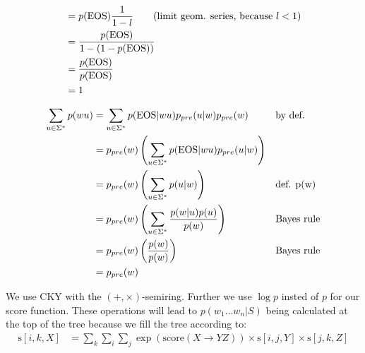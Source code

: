 \documentclass[a4paper,12pt]{ETHexercise}
\begin{document}
\begin{question}
\begin{subquestion}
\begin{align}
			                           & = p(\text{EOS}) \frac{1}{1-l} \quad\quad \text{(limit geom. series, because $l < 1$)} \label{1b_sum_p2}                                                                                                              \\
			                           & = \frac{p(\text{EOS})}{1 - (1-p(\text{EOS}))}                                                                                                                                                                              \\
			                           & = \frac{p(\text{EOS})}{p(\text{EOS})}                                                                                                                                                                                      \\
			                           & = 1
		\end{align}
	\end{subquestion}
	\begin{subquestion}
		\begin{align}
			\sum_{u \in \Sigma^*} p(wu) & = \sum_{u \in \Sigma^*} p(\text{EOS} | wu) p_{pre}(u|w)p_{pre}(w)                &  & \text{by def.}    \\
			                            & = p_{pre}(w) \left( \sum_{u \in \Sigma^*} p(\text{EOS} | wu) p_{pre}(u|w)\right)                        \\
			                            & = p_{pre}(w) \left( \sum_{u \in \Sigma^*}p(u | w) \right)                  &  & \text{def. p(w)}  \\
			                            & = p_{pre}(w) \left( \sum_{u \in \Sigma^*} \frac{p(w|u)p(u)}{p(w)} \right)  &  & \text{Bayes rule} \\
			                            & = p_{pre}(w) \left( \frac{p(w)}{p(w)}\right)                               &  & \text{Bayes rule} \\
			                            & = p_{pre}(w)
		\end{align}
	\end{subquestion}
	\begin{subquestion}
		We use CKY with the $(+, \times)$-semiring. Further we use $\log p$ insted of $p$ for our score function. These operations will lead to $p(w_1 \dots w_n | S)$ being calculated at the top of the tree because we fill the tree according to:
		\begin{align}
			\text{s} [i,k,X] & = \sum_{k}^{} \sum_{i} \sum_{j} \exp (\text{score} (X \rightarrow YZ)) \times \text{s} [i,j,Y] \times \text{s} [j,k,Z] \\

\end{align}
\end{subquestion}
\end{question}
\end{document}
